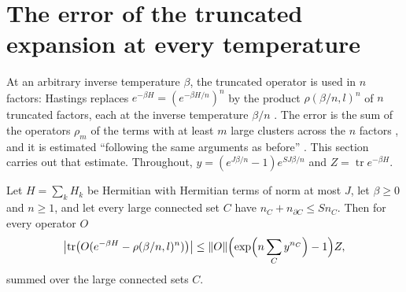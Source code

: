 \section{The error of the truncated expansion at every temperature}
\label{sec:hastings_temperature_error}

At an arbitrary inverse temperature $\beta$, the truncated operator is used in
$n$ factors: Hastings replaces $e^{-\beta H}=(e^{-\beta H/n})^n$ by the product
$\rho(\beta/n,l)^n$ of $n$ truncated factors, each at the inverse temperature
$\beta/n$ \cite[lines 1303--1314]{Hastings2006Solving}. The error is the sum of
the operators $\rho_m$ of the terms with at least $m$ large clusters across the
$n$ factors \cite[lines 1334--1341]{Hastings2006Solving}, and it is estimated
``following the same arguments as before''
\cite[lines 1342--1347]{Hastings2006Solving}. This section carries out that
estimate. Throughout, $y=(e^{J\beta/n}-1)e^{SJ\beta/n}$ and
$Z=\operatorname{tr}e^{-\beta H}$.

\begin{lemma}
    \label{thm:hastings_temperature_error}
    \leanok
    Let $H=\sum_kH_k$ be Hermitian with Hermitian terms of norm at most $J$, let
    $\beta\ge0$ and $n\ge1$, and let every large connected set $C$ have
    $n_C+n_{\partial C}\le Sn_C$. Then for every operator $O$
    \begin{align}
        \bigl|\operatorname{tr}\bigl(O(e^{-\beta H}-\rho(\beta/n,l)^n)\bigr)\bigr|
        \le\|O\|\Bigl(\exp\Bigl(n\sum_Cy^{n_C}\Bigr)-1\Bigr)Z,
        \label{eq:hastings_temperature_error}
    \end{align}
    summed over the large connected sets $C$.
\end{lemma}

